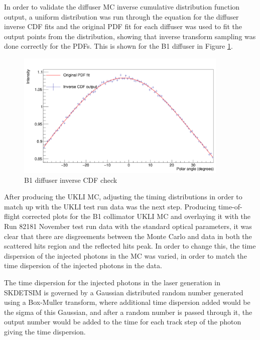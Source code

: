 In order to validate the diffuser MC inverse cumulative distribution function output, a uniform distribution was run through the equation for the diffuser inverse CDF fits and the original PDF fit for each diffuser was used to fit the output points from the distribution, showing that inverse transform sampling was done correctly for the PDFs. This is shown for the B1 diffuser in Figure \ref{fig:inv_cdf_check}. 

\begin{figure}
    \centering
    \includegraphics[width=0.9\textwidth]{Figures/inv_cdf_check_diff_B1.PNG}
    \caption{B1 diffuser inverse CDF check}
    \label{fig:inv_cdf_check}
\end{figure}


After producing the UKLI MC, adjusting the timing distributions in order to match up with the UKLI test run data was the next step. Producing time-of-flight corrected plots for the B1 collimator UKLI MC and overlaying it with the Run 82181 November test run data with the standard optical parameters, it was clear that there are disgreements between the Monte Carlo and data in both the scattered hits region and the reflected hits peak. In order to change this, the time dispersion of the injected photons in the MC was varied, in order to match the time dispersion of the injected photons in the data.

The time dispersion for the injected photons in the laser generation in SKDETSIM is governed by a Gaussian distributed random number generated using a Box-Muller transform, where additional time dispersion added would be the sigma of this Gaussian, and after a random number is passed through it, the output number would be added to the time for each track step of the photon giving the time dispersion.

